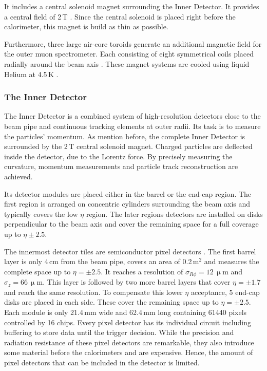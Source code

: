 \documentclass[bachelor,ngerman,english]{GAUBM}
\begin{document}
It includes a central solenoid magnet surrounding the Inner Detector. It provides a central field of 2\,T \cite{atlas:tech_design_report_01}. Since the central solenoid is placed right before the calorimeter, this magnet is build as thin as possible. 

Furthermore, three large air-core toroids generate an additional magnetic field for the outer muon spectrometer. Each consisting of eight symmetrical coils placed radially around the beam axis \cite{atlas:tech_design_report_01}. These magnet systems are cooled using liquid Helium at 4.5\,K \cite{atlas:tech_design_report_01}. 

\subsubsection*{The Inner Detector}
The Inner Detector \cite{atlas:tech_design_report_inner_01,atlas:tech_design_report_inner_02} is a combined system of high-resolution detectors close to the beam pipe and continuous tracking elements at outer radii. Its task is to measure the particles' momentum. As mention before, the complete Inner Detector is surrounded by the 2\,T central solenoid magnet. Charged particles are deflected inside the detector, due to the Lorentz force. By precisely measuring the curvature, momentum measurements and particle track reconstruction are achieved.

Its detector modules are placed either in the barrel or the end-cap region. The first region is arranged on concentric cylinders surrounding the beam axis and typically covers the low $\eta$ region. The later regions detectors are installed on disks perpendicular to the beam axis and cover the remaining space for a full coverage up to $\eta\pm2.5$.

The innermost detector tiles are semiconductor pixel detectors \cite{atlas:tech_design_report_01,atlas:pixel_detector}. The first barrel layer is only 4\,cm from the beam pipe, covers an area of 0.2\,m$^2$ and measures the complete space up to $\eta=\pm2.5$. It reaches a resolution of $\sigma_{R\phi}=12\,\upmu\text{m}$ and $\sigma_{z}=66\,\upmu\text{m}$. This layer is followed by two more barrel layers that cover $\eta=\pm1.7$ and reach the same resolution. To compensate this lower $\eta$ acceptance, 5 end-cap disks are placed in each side. These cover the remaining space up to $\eta=\pm2.5$. Each module is only 21.4\,mm wide and 62.4\,mm long containing 61440 pixels controlled by 16 chips. Every pixel detector has its individual circuit including buffering to store data until the trigger decision. While the precision and radiation resistance of these pixel detectors are remarkable, they also introduce some material before the calorimeters and are expensive. Hence, the amount of pixel detectors that can be included in the detector is limited. 
\end{document}

